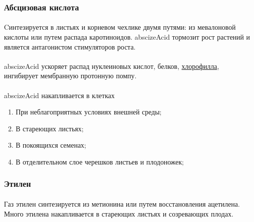\subsubsection*{Абсцизовая кислота}

\paragraph*{}Cинтезируется в листьях и корневом чехлике двумя путями: из мевалоновой кислоты или путем распада каротиноидов. \hypertarget{abscizeAcid}{\gls{abscizeAcid}} тормозит рост растений и является антагонистом стимуляторов роста. 

\paragraph*{} 

\paragraph*{}\gls{abscizeAcid} ускоряет распад нуклеиновых кислот, белков, \hyperlink{sect_hlorophilus}{хлорофилла}, ингибирует мембранную протонную помпу. 

\paragraph*{}\gls{abscizeAcid} накапливается в клетках

\begin{enumerate}
	\item При неблагоприятных условиях внешней среды;
	\item В стареющих листьях;
	\item В покоящихся семенах;
	\item В отделительном слое черешков листьев и плодоножек;
\end{enumerate}

\subsubsection*{Этилен}

\paragraph*{}Газ \hypertarget{eten}{этилен} синтезируется из метионина или путем восстановления ацетилена. Много этилена накапливается в стареющих листьях и созревающих плодах. 

